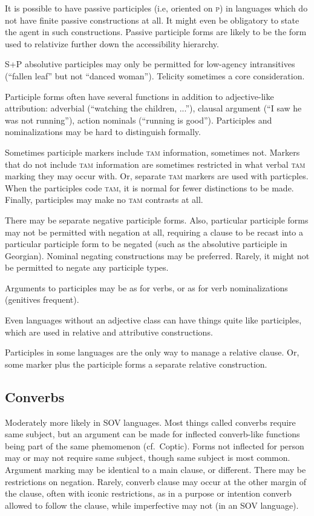 \documentclass[11pt]{article}
\newcommand{\I}[1]{\textsc{#1}}   %
\begin{document}
It is possible to have passive participles (i.e, oriented on \I{p}) in
languages which do not have finite passive constructions at all.  It
might even be obligatory to state the agent in such constructions.
Passive participle forms are likely to be the form used to relativize
further down the accessibility hierarchy.

\I{S+P} absolutive participles may only be permitted for low-agency
intransitives (``fallen leaf'' but not ``danced woman'').  Telicity
sometimes a core consideration.

Participle forms often have several functions in addition to
adjective-like attribution: adverbial (``watching the children,
...''), clausal argument (``I saw he was not running''), action
nominals (``running is good'').  Participles and nominalizations may
be hard to distinguish formally.

Sometimes participle markers include \I{tam} information, sometimes
not.  Markers that do not include \I{tam} information are sometimes
restricted in what verbal \I{tam} marking they may occur with.  Or,
separate \I{tam} markers are used with particples.  When the
participles code \I{tam}, it is normal for fewer distinctions to be
made.  Finally, participles may make no \I{tam} contrasts at all.

There may be separate negative participle forms.  Also, particular
participle forms may not be permitted with negation at all, requiring
a clause to be recast into a particular participle form to be negated
(such as the absolutive participle in Georgian).  Nominal negating
constructions may be preferred.  Rarely, it might not be permitted to
negate any participle types.

Arguments to participles may be as for verbs, or as for verb
nominalizations (genitives frequent).

Even languages without an adjective class can have things quite like
participles, which are used in relative and attributive constructions. 

Participles in some languages are the only way to manage a relative
clause.  Or, some marker plus the participle forms a separate relative
construction. 


\subsection{Converbs}
Moderately more likely in SOV languages. Most things called converbs
require same subject, but an argument can be made for inflected
converb-like functions being part of the same phemomenon (cf.\
Coptic).  Forms not inflected for person may or may not require same
subject, though same subject is most common.  Argument marking may be
identical to a main clause, or different.  There may be restrictions
on negation.  Rarely, converb clause may occur at the other margin of
the clause, often with iconic restrictions, as in a purpose or
intention converb allowed to follow the clause, while imperfective may
not (in an SOV language).
\end{document}
